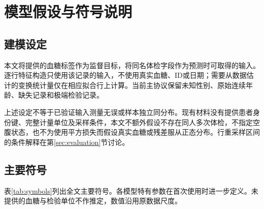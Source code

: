 \section{模型假设与符号说明}\label{sec:assumptions}

\subsection{建模设定}
本文将提供的血糖标签作为监督目标，将同名体检字段作为预测时可取得的输入。逐行特征构造只使用该记录的输入，不使用真实血糖、ID或日期；需要从数据估计的变换统计量仅在相应拟合行上计算。当前主协议保留未知性别、原始连续年龄、缺失记录和极端检验记录。

上述设定不等于已验证输入测量无误或样本独立同分布。现有材料没有提供患者身份键、完整计量单位及采样条件，本文不额外假设不存在同人多次体检，不指定空腹状态，也不为使用平方损失而假设真实血糖或残差服从正态分布。行重采样区间的条件解释在第\ref{sec:evaluation}节讨论。

\subsection{主要符号}
表\ref{tab:symbols}列出全文主要符号。各模型特有参数在首次使用时进一步定义。未提供的血糖与检验单位不作推定，数值沿用原数据尺度。

